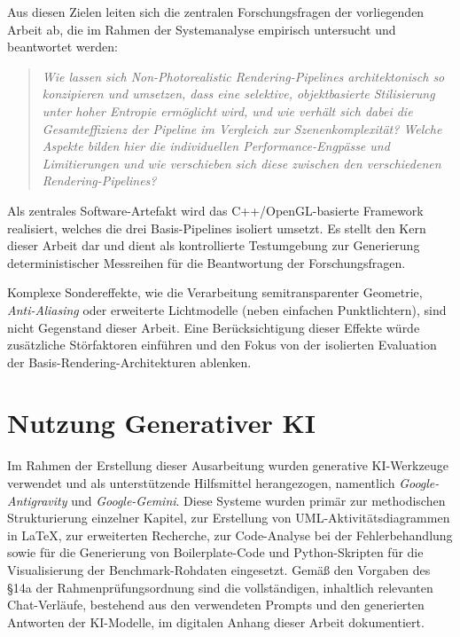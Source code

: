 Aus diesen Zielen leiten sich die zentralen Forschungsfragen der vorliegenden Ar\-beit \-ab, die im Rahmen der
Systemanalyse empirisch untersucht und beantwortet werden:

\begin{quote}
    \textit{Wie lassen sich Non-Photorealistic Rendering-Pipelines architektonisch so konzipieren und umsetzen, dass
    eine selektive, objektbasierte Stilisierung unter hoher Entropie ermöglicht wird, und wie verhält
    sich dabei die Gesamteffizienz der Pipeline im Vergleich zur Szenenkomplexität? Welche Aspekte bilden hier die
    individuellen Performance-Engpässe und Limitierungen und wie verschieben sich diese zwischen den verschiedenen
    Rendering-Pipelines?}
\end{quote}

Als zentrales Software-Artefakt wird das C++/OpenGL-basierte Framework  realisiert,
welches die drei Basis-Pipelines isoliert umsetzt.
Es stellt den Kern dieser Arbeit dar und dient als kontrollierte Testumgebung zur Generierung deterministischer
Messreihen für die Beantwortung der Forschungsfragen.

Komplexe Sondereffekte, wie die Verarbeitung semitransparenter Geometrie, \textit{Anti-Aliasing} oder
erweiterte Lichtmodelle (neben einfachen Punktlichtern), sind nicht Gegenstand dieser Arbeit.
Eine Berücksichtigung dieser Effekte würde zusätzliche Störfaktoren einführen und den Fokus von der
isolierten Evaluation der Basis-Rendering-Architekturen ablenken.


\section{Nutzung Generativer KI}
\label{sec:0103_AI}

Im Rahmen der Erstellung dieser Ausarbeitung wurden generative KI-Werkzeuge verwendet und als unterstützende Hilfsmittel
herangezogen, namentlich \textit{Google-Antigravity} und \textit{Google-Gemini}.
Diese Systeme wurden primär zur methodischen Strukturierung einzelner Kapitel, zur Erstellung von
UML-Aktivitätsdiagrammen in LaTeX, zur erweiterten Recherche, zur Code-Analyse bei der Fehlerbehandlung sowie
für die Generierung von Boilerplate-Code und Python-Skripten für die Visualisierung der Benchmark-Rohdaten eingesetzt.
Gemäß den Vorgaben des §14a der Rahmenprüfungsordnung sind die vollständigen, inhaltlich relevanten Chat-Verläufe,
bestehend aus den verwendeten Prompts und den generierten Antworten der KI-Modelle, im digitalen Anhang dieser Arbeit
dokumentiert.


